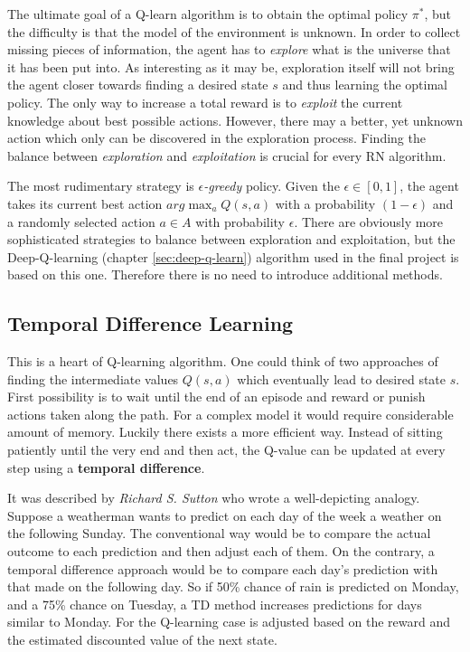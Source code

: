 The ultimate goal of a Q-learn algorithm is to obtain the optimal policy $\pi^{*}$, but the difficulty is that the model of the environment is unknown. In order to collect missing pieces of information, the agent has to \emph{explore} what is the universe that it has been put into. As interesting as it may be, exploration itself will not bring the agent closer towards finding a desired state $s$ and thus learning the optimal policy. The only way to increase a total reward is to \emph{exploit} the current knowledge about best possible actions. However, there may a better, yet unknown action which only can be discovered in the exploration process. Finding the balance between \emph{exploration} and \emph{exploitation} is crucial for every RN algorithm.

The most rudimentary strategy is \emph{$\epsilon$-greedy} policy. Given the $\epsilon \in [0, 1]$, the agent takes its current best action $arg\max_a Q(s, a)$ with a probability $(1 - \epsilon)$ and a randomly selected action $a \in A$ with probability $\epsilon$. There are obviously more sophisticated strategies to balance between exploration and exploitation, but the Deep-Q-learning (chapter \ref{sec:deep-q-learn}) algorithm used in the final project is based on this one. Therefore there is no need to introduce additional methods.

\subsection{Temporal Difference Learning}
\label{sub:temporal-difference-learning}

This is a heart of Q-learning algorithm. One could think of two approaches of finding the intermediate values $Q(s, a)$ which eventually lead to desired state $s$. First possibility is to wait until the end of an episode and reward or punish actions taken along the path. For a complex model it would require considerable amount of memory. Luckily there exists a more efficient way. Instead of sitting patiently until the very end and then act, the Q-value can be updated at every step using a \textbf{temporal difference}.

It was described by \emph {Richard S. Sutton} \cite{SuttonTD} who wrote a well-depicting analogy. Suppose a weatherman wants to predict on each day of the week a weather on the following Sunday. The conventional way would be to compare the actual outcome to each prediction and then adjust each of them. On the contrary, a temporal difference approach would be to compare each day's prediction with that made on the following day. So if 50\% chance of rain is predicted on Monday, and a 75\% chance on Tuesday, a TD method increases predictions for days similar to Monday. For the Q-learning case is adjusted based on the reward and the estimated discounted value of the next state.


